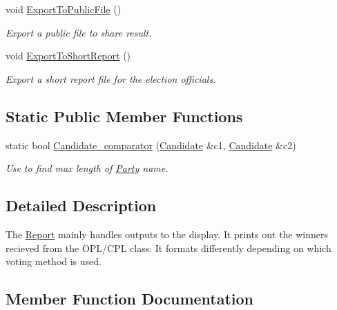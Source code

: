 \begin{DoxyCompactItemize}
\mbox{\label{classReport_ada96baddb6098c28bd05faccaa84894a}} 
void \hyperlink{classReport_ada96baddb6098c28bd05faccaa84894a}{Export\+To\+Public\+File} ()
\begin{DoxyCompactList}\small\item\em Export a public file to share result. \end{DoxyCompactList}\item 
\mbox{\label{classReport_a0cd64b8041ef4eb2afe0b22653072d24}} 
void \hyperlink{classReport_a0cd64b8041ef4eb2afe0b22653072d24}{Export\+To\+Short\+Report} ()
\begin{DoxyCompactList}\small\item\em Export a short report file for the election officials. \end{DoxyCompactList}\end{DoxyCompactItemize}
\subsection*{Static Public Member Functions}
\begin{DoxyCompactItemize}
\item 
static bool \hyperlink{classReport_a8777551592f499ba5cee61ecf4781b48}{Candidate\+\_\+comparator} (\hyperlink{classCandidate}{Candidate} \&c1, \hyperlink{classCandidate}{Candidate} \&c2)
\begin{DoxyCompactList}\small\item\em Use to find max length of \hyperlink{classParty}{Party} name. \end{DoxyCompactList}\end{DoxyCompactItemize}


\subsection{Detailed Description}
The \hyperlink{classReport}{Report} mainly handles outputs to the display. It prints out the winners recieved from the O\+P\+L/\+C\+PL class. It formats differently depending on which voting method is used. 

\subsection{Member Function Documentation}
\mbox{\label{classReport_a8777551592f499ba5cee61ecf4781b48}} 
